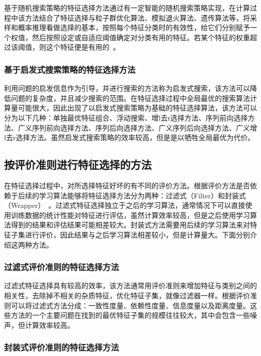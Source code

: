 基于随机搜索策略的特征选择方法通过有一定智能的随机搜索策略实现，在计算过程中该方法结合了特征选择与粒子群优化算法、模拟退火算法、遗传算法等，将采样和概率推理看做选择的基本，按照每个特征分类时的有效性，给它们分别赋予一个权值，然后按照设定或自适应阈值确定对分类有用的特征。若某个特征的权重超过该阈值，则这个特征便是有用的~\cite{宁永鹏2014高维小样本数据的特征选择研究及其稳定性分析}。

\subsubsection{基于启发式搜索策略的特征选择方法}

利用问题的启发信息作为引导，并进行搜索的方法称为启发式搜索，该方法可以降低问题的复杂度，并且减少搜索的范围。在特征选择过程中全局最优的搜索算法计算量可能很大，因此出现了以启发式搜索策略为基础的特征选择算法，该方法可以分为以下几种：单独最优特征组合、浮动搜索、增l去r选择方法、序列前向选择方法、广义序列前向选择方法、序列后向选择方法、广义序列后向选择方法、广义增l去r选择方法。虽然启发式搜索策略的效率较高，但是是以牺牲全局最优为代价。

\subsection{按评价准则进行特征选择的方法}

在特征选择过程中，对所选择特征好坏的有不同的评价方法。根据评价方法是否依赖于后续的学习算法能够将特征选择方法分为两种：过滤式（Filter）和封装式（Wrapper）~\cite{宁永鹏2014高维小样本数据的特征选择研究及其稳定性分析}。过滤式特征选择独立于之后的学习算法，通常情况下可以直接使用训练数据的统计性能对特征进行评估，虽然计算效率较高，但是之后使用学习算法得到的结果和评估结果可能相差较大。封装式方法需要用后续的学习算法来对特征子集进行评价，因此结果与之后学习算法相差较小，但是计算量大。下面分别介绍这两种方法。

\subsubsection{过滤式评价准则的特征选择方法}

过滤式特征选择具有较高的效率，该方法通常用评价准则来增加特征与类别之间的相关性，去除掉不相关的杂质特征，优化特征子集，就像过滤器一样。根据评价准则可以将过滤式方法分成：一致性度量、依赖性度量、信息度量以及距离度量。这些方法的一个主要问题在找到的最优特征子集的规模往往较大，其中会包含一些噪声，但计算效率较高。

\subsubsection{封装式评价准则的特征选择方法}

